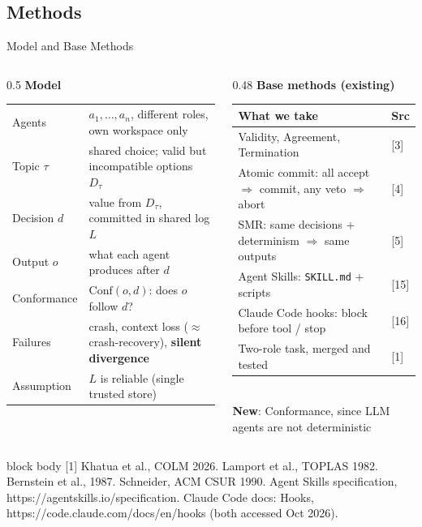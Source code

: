 \documentclass[aspectratio=169,11pt]{beamer}
\newcommand{\papercite}[1]{%
  \vfill
  \begin{beamercolorbox}[wd=\textwidth,sep=3pt]{block body}
    \tiny #1
  \end{beamercolorbox}}
\begin{document}
\subsection{Methods}
\begin{frame}{Model and Base Methods}
  \scriptsize
  \begin{columns}[T]
    \begin{column}{0.5\textwidth}
      \textbf{Model}\\[2pt]
      \begin{tabularx}{\linewidth}{l X}
        \toprule
        Agents & $a_1,\dots,a_n$, different roles, own workspace only \\
        Topic $\tau$ & shared choice; valid but incompatible options $D_\tau$ \\
        Decision $d$ & value from $D_\tau$, committed in shared log $L$ \\
        Output $o$ & what each agent produces after $d$ \\
        Conformance & $\mathrm{Conf}(o,d)$: does $o$ follow $d$? \\
        Failures & crash, context loss ($\approx$ crash-recovery), \textbf{silent divergence} \\
        Assumption & $L$ is reliable (single trusted store) \\
        \bottomrule
      \end{tabularx}
    \end{column}
    \begin{column}{0.48\textwidth}
      \textbf{Base methods (existing)}\\[2pt]
      \begin{tabularx}{\linewidth}{X l}
        \toprule
        What we take & Src \\
        \midrule
        Validity, Agreement, Termination & [3] \\
        Atomic commit: all accept $\Rightarrow$ commit, any veto $\Rightarrow$ abort & [4] \\
        SMR: same decisions + determinism $\Rightarrow$ same outputs & [5] \\
        Agent Skills: \texttt{SKILL.md} + scripts & [15] \\
        Claude Code hooks: block before tool / stop & [16] \\
        Two-role task, merged and tested & [1] \\
        \bottomrule
      \end{tabularx}\\[4pt]
      \textbf{New}: Conformance, since LLM agents are not deterministic
    \end{column}
  \end{columns}
  \papercite{[1] Khatua et al., COLM 2026. \; [3] Lamport et al., TOPLAS 1982. \; [4] Bernstein et al., 1987. \; [5] Schneider, ACM CSUR 1990. \;
  [15] Agent Skills specification, https://agentskills.io/specification. \; [16] Claude Code docs: Hooks, https://code.claude.com/docs/en/hooks (both accessed Oct 2026).}
\end{frame}
\end{document}
